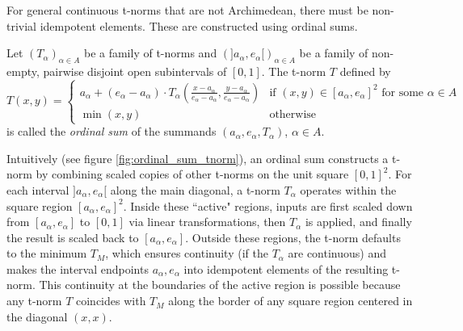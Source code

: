 For general continuous t-norms that are not Archimedean, there must be non-trivial idempotent elements. These are constructed using ordinal sums.
\begin{definition}
Let $(T_\alpha)_{\alpha \in A}$ be a family of t-norms and $(]a_\alpha, e_\alpha[)_{\alpha \in A}$ be a family of non-empty, pairwise disjoint open subintervals of $[0,1]$. The t-norm $T$ defined by
\[
T(x,y) =
\begin{cases}
  a_\alpha + (e_\alpha - a_\alpha) \cdot T_\alpha \left( \frac{x-a_\alpha}{e_\alpha - a_\alpha}, \frac{y-a_\alpha}{e_\alpha - a_\alpha} \right) & \text{if } (x,y) \in [a_\alpha, e_\alpha]^2 \text{ for some } \alpha \in A \\
  \min(x,y) & \text{otherwise}
\end{cases}
\]
is called the \emph{ordinal sum} of the summands $(a_\alpha, e_\alpha, T_\alpha)$, $\alpha \in A$.
\end{definition}
Intuitively (see figure \ref{fig:ordinal_sum_tnorm}), an ordinal sum constructs a t-norm by combining scaled copies of other t-norms on the unit square $[0,1]^2$. For each interval $]a_\alpha, e_\alpha[$ along the main diagonal, a t-norm $T_\alpha$ operates within the square region $[a_\alpha, e_\alpha]^2$. Inside these ``active" regions, inputs are first scaled down from $[a_\alpha, e_\alpha]$ to $[0,1]$ via linear transformations, then $T_\alpha$ is applied, and finally the result is scaled back to $[a_\alpha, e_\alpha]$. Outside these regions, the t-norm defaults to the minimum $T_M$, which ensures continuity (if the $T_\alpha$ are continuous) and makes the interval endpoints $a_\alpha, e_\alpha$ into idempotent elements of the resulting t-norm. This continuity at the boundaries of the active region is possible because any t-norm $T$ coincides with $T_M$ along the border of any square region centered in the diagonal $(x,x)$.\\

